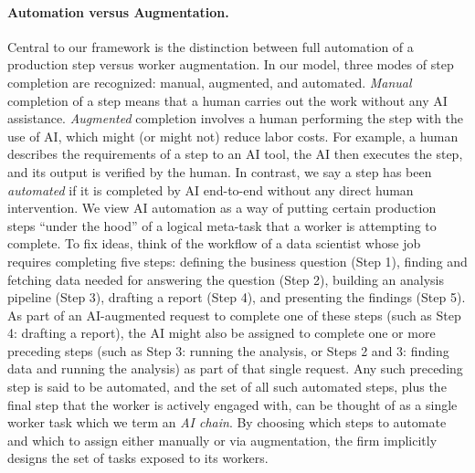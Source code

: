 \paragraph{Automation versus Augmentation.}
Central to our framework is the distinction between full automation of a production step versus worker augmentation.
In our model, three modes of step completion are recognized: manual, augmented, and automated.
\emph{Manual} completion of a step means that a human carries out the work without any AI assistance.
\emph{Augmented} completion involves a human performing the step with the use of AI, which might (or might not) reduce labor costs.
For example, a human describes the requirements of a step to an AI tool, the AI then executes the step, and its output is verified by the human.
In contrast, we say a step has been \emph{automated} if it is completed by AI end-to-end without any direct human intervention.
We view AI automation as a way of putting certain production steps ``under the hood'' of a logical meta-task that a worker is attempting to complete.
To fix ideas, think of the workflow of a data scientist whose job requires completing five steps: defining the business question (Step 1), finding and fetching data needed for answering the question (Step 2), building an analysis pipeline (Step 3), drafting a report (Step 4), and presenting the findings (Step 5).
As part of an AI-augmented request to complete one of these steps (such as Step 4: drafting a report), the AI might also be assigned to complete one or more preceding steps (such as Step 3: running the analysis, or Steps 2 and 3: finding data and running the analysis) as part of that single request.
Any such preceding step is said to be automated, and the set of all such automated steps, plus the final step that the worker is actively engaged with, can be thought of as a single worker task which we term an \emph{AI chain}.
By choosing which steps to automate and which to assign either manually or via augmentation, the firm implicitly designs the set of tasks exposed to its workers.


